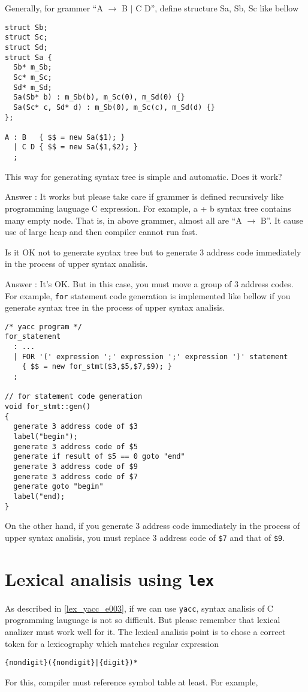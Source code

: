 \begin{QandA}
Generally, for grammer ``A $\rightarrow$ B $|$ C D'', define
structure Sa, Sb, Sc like bellow
\begin{verbatim}
struct Sb;
struct Sc;
struct Sd;
struct Sa {
  Sb* m_Sb;
  Sc* m_Sc;
  Sd* m_Sd;
  Sa(Sb* b) : m_Sb(b), m_Sc(0), m_Sd(0) {}
  Sa(Sc* c, Sd* d) : m_Sb(0), m_Sc(c), m_Sd(d) {}
};

A : B   { $$ = new Sa($1); }
  | C D { $$ = new Sa($1,$2); }
  ;
\end{verbatim}
This way for generating syntax tree is simple and automatic.
Does it work?

Answer : It works but please take care if grammer is defined
recursively like programming lauguage C expression. For example,
a + b syntax tree contains many empty node. That is, in above
grammer, almost all are ``A $\rightarrow$ B''.
It cause use of large heap and then compiler cannot run fast.
\end{QandA}

\begin{QandA}
\label{lex_yacc_e001}
Is it OK not to generate syntax tree but to generate 3 address
code immediately in the process of upper syntax analisis.

Answer : It's OK. But in this case, you must move a 
group of 3 address codes. For example, {\tt{for}} statement
code generation is implemented like bellow if you generate
syntax tree in the process of upper syntax analisis.

\begin{verbatim}
/* yacc program */
for_statement
  : ...
  | FOR '(' expression ';' expression ';' expression ')' statement
    { $$ = new for_stmt($3,$5,$7,$9); }
  ;

// for statement code generation
void for_stmt::gen()
{
  generate 3 address code of $3
  label("begin");
  generate 3 address code of $5
  generate if result of $5 == 0 goto "end"
  generate 3 address code of $9
  generate 3 address code of $7
  generate goto "begin"
  label("end);
}
\end{verbatim}

On the other hand, if you generate 3 address code immediately in the
process of upper syntax analisis,
you must replace 3 address code of {\tt{\$7}}
and that of {\tt{\$9}}.
\end{QandA}

\section{Lexical analisis using {\tt{lex}}}
\label{lex_yacc_e004}
As described in \ref{lex_yacc_e003}, if we can use  {\tt{yacc}},
syntax analisis of C programming lauguage is not so difficult.
But please remember that lexical analizer must work well for it.
The lexical analisis point is to chose a correct token
for a lexicography which matches
regular expression
\begin{verbatim}
{nondigit}({nondigit}|{digit})*
\end{verbatim}
For this, compiler must reference symbol table at least. For example,

